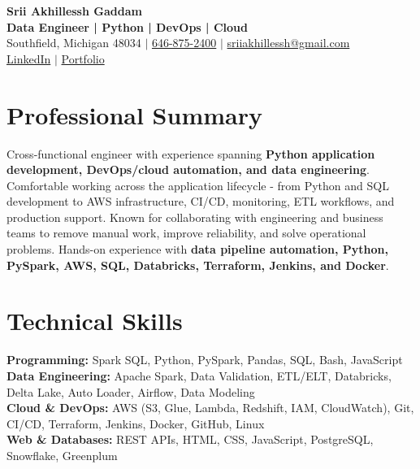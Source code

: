 \documentclass[letterpaper,10pt]{article}
\begin{document}
\fontsize{9.35pt}{10.45pt}\selectfont

\begin{center}
    {\LARGE \textbf{Srii Akhillessh Gaddam}} \\[-1pt]
    \textbf{Data Engineer | Python | DevOps | Cloud} \\[2pt]
    Southfield, Michigan 48034 $|$
    \href{tel:6468752400}{646-875-2400} $|$
    \href{mailto:sriiakhillessh@gmail.com}{sriiakhillessh@gmail.com} \\[1pt]
    \href{https://www.linkedin.com/in/srii-akhiilessh-gaddam-b48668191/}{LinkedIn} $|$
    \href{https://sriiakhillesshg.github.io/portfolio/}{Portfolio}
\end{center}
\vspace{-8pt}

\section{Professional Summary}
\small{Cross-functional engineer with experience spanning \textbf{Python application development, DevOps/cloud automation, and data engineering}. Comfortable working across the application lifecycle - from Python and SQL development to AWS infrastructure, CI/CD, monitoring, ETL workflows, and production support. Known for collaborating with engineering and business teams to remove manual work, improve reliability, and solve operational problems. Hands-on experience with \textbf{data pipeline automation, Python, PySpark, AWS, SQL, Databricks, Terraform, Jenkins, and Docker}.}

\section{Technical Skills}
\small{
\textbf{Programming:} Spark SQL, Python, PySpark, Pandas, SQL, Bash, JavaScript \\
\textbf{Data Engineering:} Apache Spark, Data Validation, ETL/ELT, Databricks, Delta Lake, Auto Loader, Airflow, Data Modeling \\
\textbf{Cloud \& DevOps:} AWS (S3, Glue, Lambda, Redshift, IAM, CloudWatch), Git, CI/CD, Terraform, Jenkins, Docker, GitHub, Linux \\
\textbf{Web \& Databases:} REST APIs, HTML, CSS, JavaScript, PostgreSQL, Snowflake, Greenplum
}

\end{document}
